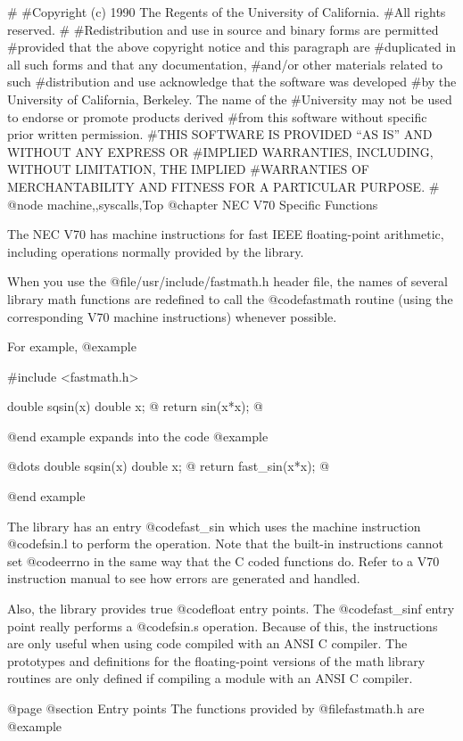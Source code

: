 #
#Copyright (c) 1990 The Regents of the University of California.
#All rights reserved.
#
#Redistribution and use in source and binary forms are permitted
#provided that the above copyright notice and this paragraph are
#duplicated in all such forms and that any documentation,
#and/or other materials related to such
#distribution and use acknowledge that the software was developed
#by the University of California, Berkeley.  The name of the
#University may not be used to endorse or promote products derived
#from this software without specific prior written permission.
#THIS SOFTWARE IS PROVIDED ``AS IS'' AND WITHOUT ANY EXPRESS OR
#IMPLIED WARRANTIES, INCLUDING, WITHOUT LIMITATION, THE IMPLIED
#WARRANTIES OF MERCHANTABILITY AND FITNESS FOR A PARTICULAR PURPOSE.
#
@node machine,,syscalls,Top
@chapter NEC V70 Specific Functions

The NEC V70 has machine instructions for fast IEEE floating-point
arithmetic, including operations normally provided by the library.  

When you use the @file{/usr/include/fastmath.h} header file, the
names of several library math functions are redefined to call the
@code{fastmath} routine (using the corresponding V70 machine instructions)
whenever possible.

For example,
@example

#include <fastmath.h>

double sqsin(x)
double x;
@{
  return sin(x*x);
@}

@end example
expands into the code
@example

@dots{}
double sqsin(x)
double x;
@{
  return fast_sin(x*x);
@}

@end example

The library has an entry @code{fast_sin} which uses the machine
instruction @code{fsin.l} to perform the operation.  Note that the
built-in instructions cannot set @code{errno}
in the same way that the C coded functions do.  Refer to a V70
instruction manual to see how errors are generated and handled.

Also, the library provides true @code{float} entry points.  The
@code{fast_sinf} entry point really performs a @code{fsin.s}
operation.  Because of this, the instructions are only useful when
using code compiled with an ANSI C compiler.  The prototypes
and definitions for the floating-point versions of the math library
routines are only defined if compiling a module with an ANSI C
compiler.

@page
@section Entry points 
The functions provided by @file{fastmath.h} are
@example

